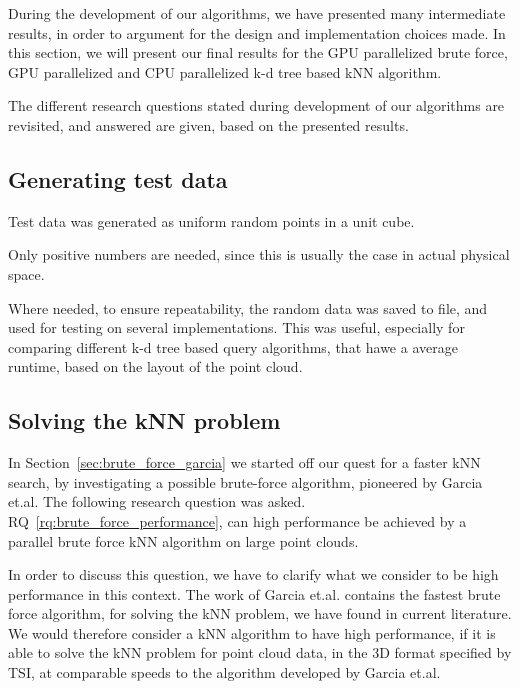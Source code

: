 During the development of our algorithms, we have presented many intermediate results, in order to argument for the design and implementation choices made. In this section, we will present our final results for the GPU parallelized brute force, GPU parallelized and CPU parallelized k-d tree based kNN algorithm.

The different research questions stated during development of our algorithms are revisited, and answered are given, based on the presented results.

\subsection{Generating test data} %
\label{sub:generating_test_data}

Test data was generated as uniform random points in a unit cube.

Only positive numbers are needed, since this is usually the case in actual physical space.

Where needed, to ensure repeatability, the random data was saved to file, and used for testing on several implementations. This was useful, especially for comparing different k-d tree based query algorithms, that hawe a average runtime, based on the layout of the point cloud.


\subsection{Solving the kNN problem} %
\label{sub:solving_the_knn_problem}

In Section~\ref{sec:brute_force_garcia} we started off our quest for a faster kNN search, by investigating a possible brute-force algorithm, pioneered by Garcia et.al. The following research question was asked. RQ~\ref{rq:brute_force_performance}, can high performance be achieved by a parallel brute force kNN algorithm on large point clouds.

In order to discuss this question, we have to clarify what we consider to be high performance in this context. The work of Garcia et.al. contains the fastest brute force algorithm, for solving the kNN problem, we have found in current literature. We would therefore consider a kNN algorithm to have high performance, if it is able to solve the kNN problem for point cloud data, in the 3D format specified by TSI, at comparable speeds to the algorithm developed by Garcia et.al. 

